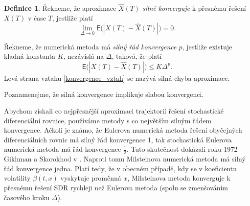 \documentclass[a4paper,12pt]{report}
\theoremstyle{definition} \newtheorem{definice}[veta]{Definice}
\theoremstyle{remark}
\begin{document}
\begin{definice}\label{konvergence_def}
Řekneme, že aproximace $\hat X(T)$ \textit{silně konverguje} k přesnému řešení $X(T)$ v čase $T$, jestliže platí
\begin{equation}
\lim_{\Delta\to0}\mathsf{E}\big(|X(T)-\hat X(T)|\big)=0.
\end{equation}

Řekneme, že numerická metoda má \textit{silný řád konvergence $p$}, jestliže existuje kladná konstanta $K$, nezávislá na $\Delta$, taková, že platí
\begin{equation}\label{konvergence_vztah}
\mathsf{E}\big(|X(T)-\hat X(T)|\big)\leq K\Delta^p.
\end{equation}
Levá strana vztahu \eqref{konvergence_vztah} se nazývá silná chyba aproximace.
\end{definice}
Poznamenejme, že silná konvergence implikuje slabou konvergenci.

Abychom získali co nejpřesnější aproximaci trajektorií řešení stochastické diferenciální rovnice, používáme metody s co největším silným řádem konvergence.
Ačkoli je známo, že Eulerova numerická metoda řešení obyčejných diferenciálních rovnic má silný řád konvergence 1, 
tak stochastická Eulerova numerická metoda má řád konvergence $\frac12$.
Tuto skutečnost dokázali roku 1972 Gikhman a Skorokhod v \cite{gikhman1972stochastic}.
Naproti tomu Milsteinova numerická metoda má silný řád konvergence jedna.
Platí tedy, že v obecném případě, kdy se v koeficientu volatility $\beta(t,x)$ vyskytuje proměnná $x$, Milsteinova metoda konverguje k přesnému řešení SDR rychleji než Eulerova metoda (spolu se zmenšováním časového kroku $\Delta$).
\end{document}
